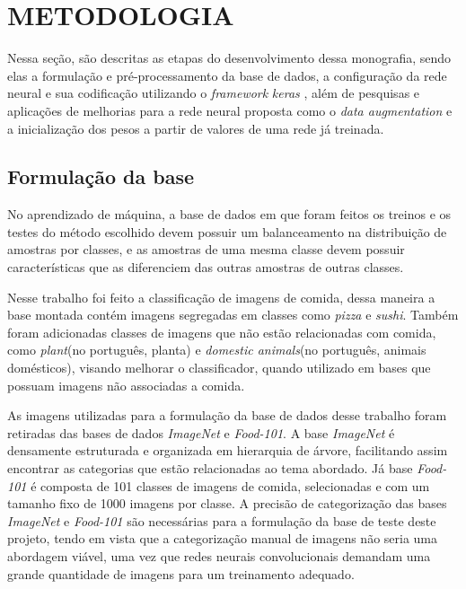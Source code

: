 
\chapter{METODOLOGIA}
\label{chap:metodologia}
Nessa seção, são descritas as etapas do desenvolvimento dessa monografia, sendo elas a formulação e pré-processamento da base de dados, a configuração da rede neural e sua codificação utilizando o \textit{framework} \textit{keras} \cite{chollet2015keras}, além de pesquisas e aplicações de melhorias para a rede neural proposta como o \textit{data augmentation} e a inicialização dos pesos a partir de valores de uma rede já treinada.

\section{Formulação da base}
No aprendizado de máquina, a base de dados em que foram feitos os treinos e os testes do método escolhido devem possuir um balanceamento na distribuição de amostras por classes, e as amostras de uma mesma classe devem possuir características que as diferenciem das outras amostras de outras classes.

\par Nesse trabalho foi feito a classificação de imagens de comida, dessa maneira a base montada contém imagens segregadas em classes como \textit{pizza} e \textit{sushi}. Também foram adicionadas classes de imagens que não estão relacionadas com comida, como \textit{plant}(no português, planta) e \textit{domestic animals}(no português, animais domésticos), visando melhorar o classificador, quando utilizado em bases que possuam imagens não associadas a comida.
\par As imagens utilizadas para a formulação da base de dados desse trabalho foram retiradas das bases de dados \textit{ImageNet}\cite{deng2009imagenet} e \textit{Food-101}\cite{bossard14}. A base \textit{ImageNet} é densamente estruturada e organizada em hierarquia de árvore, facilitando assim encontrar as categorias que estão relacionadas ao tema abordado. Já base \textit{Food-101} é composta de 101 classes de imagens de comida, selecionadas e com um tamanho fixo de 1000 imagens por classe. A precisão de categorização das bases \textit{ImageNet} e \textit{Food-101} são necessárias para a formulação da base de teste deste projeto, tendo em vista que a categorização manual de imagens não seria uma abordagem viável, uma vez que redes neurais convolucionais demandam uma grande quantidade de imagens para um treinamento adequado.  

